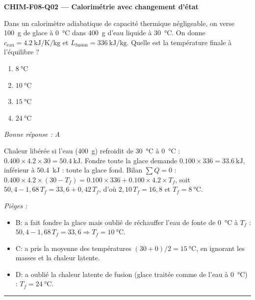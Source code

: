 \documentclass[11pt,a4paper]{article}
\begin{document}
\noindent\textbf{CHIM-F08-Q02 --- Calorimétrie avec changement d'état}\par
Dans un calorimètre adiabatique de capacité thermique négligeable, on verse \qty{100}{\gram} de glace à \qty{0}{\celsius} dans \qty{400}{\gram} d'eau liquide à \qty{30}{\celsius}. On donne $c_{\text{eau}}=\qty{4.2}{\kilo\joule\per\kelvin\per\kilogram}$ et $L_{\text{fusion}}=\qty{336}{\kilo\joule\per\kilogram}$. Quelle est la température finale à l'équilibre ?
\begin{enumerate}[label=\Alph*)]
\item $\qty{8}{\celsius}$
\item $\qty{10}{\celsius}$
\item $\qty{15}{\celsius}$
\item $\qty{24}{\celsius}$
\end{enumerate}
\textit{Bonne réponse : A}\par
Chaleur libérée si l'eau (\qty{400}{\gram}) refroidit de \qty{30}{\celsius} à \qty{0}{\celsius} : $\num{0.400}\times\num{4.2}\times30=\qty{50.4}{\kilo\joule}$. Fondre toute la glace demande $\num{0.100}\times336=\qty{33.6}{\kilo\joule}$, inférieur à \qty{50.4}{\kilo\joule} : toute la glace fond. Bilan $\sum Q=0$ : $\num{0.400}\times\num{4.2}\times(30-T_f)=\num{0.100}\times336+\num{0.100}\times\num{4.2}\times T_f$, soit $50{,}4-1{,}68\,T_f=33{,}6+0{,}42\,T_f$, d'où $2{,}10\,T_f=16{,}8$ et $T_f=\qty{8}{\celsius}$.\par
\textit{Pièges :}
\begin{itemize}
\item B: a fait fondre la glace mais oublié de réchauffer l'eau de fonte de \qty{0}{\celsius} à $T_f$ : $50{,}4-1{,}68\,T_f=33{,}6\Rightarrow T_f=\qty{10}{\celsius}$.
\item C: a pris la moyenne des températures $(30+0)/2=\qty{15}{\celsius}$, en ignorant les masses et la chaleur latente.
\item D: a oublié la chaleur latente de fusion (glace traitée comme de l'eau à \qty{0}{\celsius}) : $T_f=\qty{24}{\celsius}$.
\end{itemize}
\vspace{8pt}\hrule\vspace{8pt}
\end{document}
